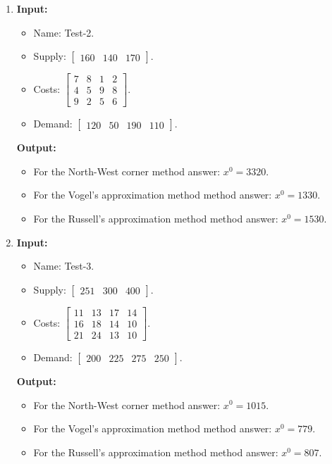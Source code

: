 \documentclass{article}
\begin{document}
\begin{enumerate}[label={(\arabic*)}, itemsep=0.25in]
    \item \textbf{Input:}
          \begin{itemize}
              \item Name: Test-2.
              \item Supply: \(\begin{bmatrix} 160 & 140 & 170 \end{bmatrix}\).
              \item Costs: \(\begin{bmatrix}
              7 & 8 & 1 & 2 \\
              4 & 5 & 9 & 8 \\
              9 & 2 & 5 & 6
              \end{bmatrix}\).
              \item Demand: \(\begin{bmatrix} 120 & 50 & 190 & 110 \end{bmatrix}\).
          \end{itemize}        
          \textbf{Output:}
          \begin{itemize}
            \item For the North-West corner method answer: \(x^0 = 3320\).
            \item For the Vogel’s approximation method method answer: \(x^0 = 1330\).
            \item For the Russell’s approximation method method answer: \(x^0 = 1530\).
          \end{itemize}

    \item \textbf{Input:}
          \begin{itemize}
              \item Name: Test-3.
              \item Supply: \(\begin{bmatrix} 251 & 300 & 400 \end{bmatrix}\).
              \item Costs: \(\begin{bmatrix}
              11 & 13 & 17 & 14 \\
              16 & 18 & 14 & 10 \\
              21 & 24 & 13 & 10
              \end{bmatrix}\).
              \item Demand: \(\begin{bmatrix} 200 & 225 & 275 & 250 \end{bmatrix}\).
          \end{itemize}        
          \textbf{Output:}
          \begin{itemize}
            \item For the North-West corner method answer: \(x^0 = 1015\).
            \item For the Vogel’s approximation method method answer: \(x^0 = 779\).
            \item For the Russell’s approximation method method answer: \(x^0 = 807\).
          \end{itemize}
\end{enumerate}
\end{document}
